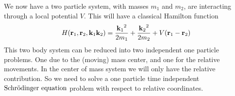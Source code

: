 We now have a two particle system, with masses $m_1$ and $m_2$, are interacting through a local potential $V$.
This will have a classical Hamilton function
%
\begin{equation}\label{eq:toSL}
H({\bf r}_1,{\bf r}_2, {\bf k}_1 {\bf k}_2)=
\frac{{{\bf k}_1}^2}{2m_1}+\frac{{{\bf k}_2}^2}{2m_2}+V({\bf r}_1-{\bf r}_2)
\end{equation}
%
This two body system can be reduced into two independent one particle problems.
One due to the (moving) mass center, and one for the relative movements. In the center of mass system
we will only have the relative contribution. 
So we need to solve a one particle time independent $\text{Schr$\ddot{\textrm{o}}$dinger equation}$ problem with respect to
relative coordinates.


